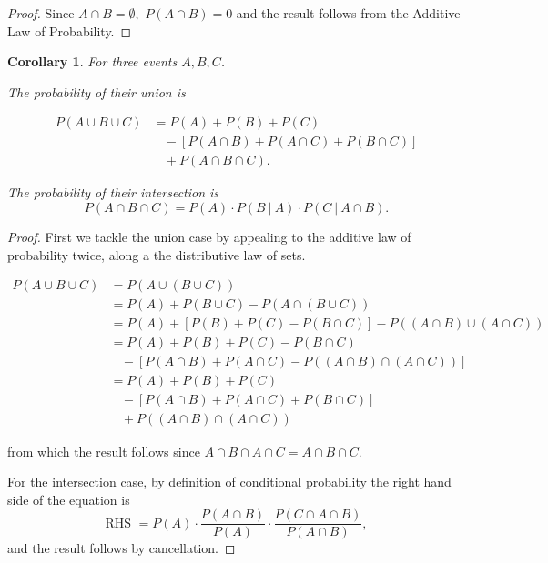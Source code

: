 \documentclass[
]{book}
\newtheorem{corollary}{Corollary}[chapter]
\theoremstyle{definition}
\theoremstyle{definition}
\theoremstyle{definition}
\theoremstyle{definition}
\theoremstyle{remark}
\begin{document}
\begin{proof}
Since \(A\cap B = \emptyset,\) \(P(A \cap B) = 0\) and the result follows from the Additive Law of Probability.
\end{proof}

\begin{corollary}
For three events \(A, B, C\).

The probability of their union is

\begin{align*}
P(A \cup B \cup C) &= P(A)+P(B)+P(C)\\
                   &~~~~ - [P(A\cap B) + P(A \cap C) + P(B \cap C)]\\
                   &~~~~ + P(A \cap B \cap C).
\end{align*}

The probability of their intersection is
\[P(A \cap B \cap C) = P(A) \cdot P(B~|~A) \cdot P(C ~|~ A \cap B).\]
\end{corollary}

\begin{proof}
First we tackle the union case by appealing to the additive law of probability twice, along a the distributive law of sets.

\begin{align*}
P(A \cup B \cup C) &= P(A \cup (B \cup C)) \\
                   &= P(A) + P(B \cup C) - P(A \cap (B \cup C)) \\
                   &= P(A) + [P(B) + P(C)- P(B \cap C)] - P((A\cap B) \cup (A \cap C)) \\
                   &= P(A) + P(B) + P(C) - P(B \cap C) \\
                   &~~~~ - [P(A \cap B)+ P(A \cap C)-P((A \cap B) \cap (A \cap C))]\\
                   &= P(A) + P(B) + P(C) \\
                   &~~~~ - [P(A\cap B) + P(A \cap C) + P(B \cap C)] \\
                   &~~~~ + P((A \cap B) \cap (A \cap C))
\end{align*}

from which the result follows since \(A \cap B \cap A \cap C = A \cap B \cap C\).

For the intersection case, by definition of conditional probability the right hand side of the equation is
\[\text{RHS } = P(A) \cdot \frac{P(A \cap B)}{P(A)} \cdot \frac{P(C\cap A\cap B)}{P(A \cap B)},\] and the result follows by cancellation.
\end{proof}
\end{document}
